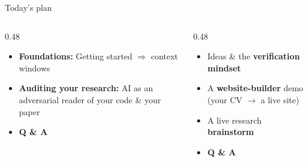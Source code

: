 \documentclass[aspectratio=169, 10pt]{beamer}
\begin{document}
\begin{frame}{Today's plan}
\vskip2pt
\begin{columns}[T]
\begin{column}{0.48\textwidth}
\begin{tcolorbox}[keybox, title={\faCompass\quad Hour 1 --- Emily}]
\small
\begin{itemize}\setlength{\itemsep}{3pt}
  \item \textbf{Foundations:} Getting started $\Rightarrow$ context windows
  \item \textbf{Auditing your research:} AI as an adversarial reader of your code \& your paper
    \item \textbf{Q \& A} 
\end{itemize}
\end{tcolorbox}
\end{column}
\begin{column}{0.48\textwidth}
\begin{tcolorbox}[keybox, title={\faComments\quad Hour 2 --- Erkmen}]
\small
\begin{itemize}\setlength{\itemsep}{3pt}
  \item Ideas \& the \textbf{verification mindset}
  \item A \textbf{website-builder} demo (your CV $\rightarrow$ a live site)
  \item A live research \textbf{brainstorm}
      \item \textbf{Q \& A} 
\end{itemize}
\end{tcolorbox}
\end{column}
\end{columns}
\vskip8pt
\end{frame}
\end{document}
